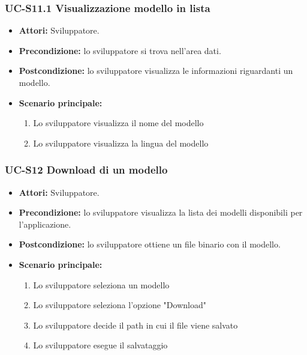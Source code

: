 \subsubsection{UC-S11.1 Visualizzazione modello in lista}
		\begin{itemize}
			\item \textbf{Attori:} Sviluppatore.
			\item \textbf{Precondizione:} lo sviluppatore si trova nell'area dati.
			\item \textbf{Postcondizione:} lo sviluppatore visualizza le informazioni riguardanti un modello.
			\item \textbf{Scenario principale:}
			\begin{enumerate}
					\item Lo sviluppatore visualizza il nome del modello
					\item Lo sviluppatore visualizza la lingua del modello
				\end{enumerate}
		\end{itemize}			
	
	\subsubsection{UC-S12 Download di un modello}
		\begin{itemize}
			\item \textbf{Attori:} Sviluppatore.
			\item \textbf{Precondizione:} lo sviluppatore visualizza la lista dei modelli disponibili per l'applicazione.
			\item \textbf{Postcondizione:} lo sviluppatore ottiene un file binario con il modello.
			\item \textbf{Scenario principale:}
			\begin{enumerate}
				\item Lo sviluppatore seleziona un modello
				\item Lo sviluppatore seleziona l'opzione "Download"
				\item Lo sviluppatore decide il path in cui il file viene salvato
				\item Lo sviluppatore esegue il salvataggio
			\end{enumerate}
		\end{itemize}	

